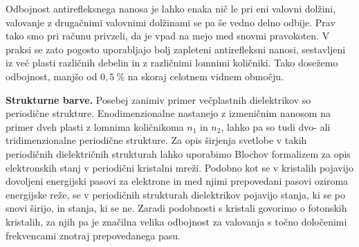 \begin{remark}
Odbojnost antirefleksnega nanosa je lahko enaka nič le pri eni valovni dolžini, valovanje z drugačnimi valovnimi 
dolžinami se pa še vedno delno odbije. Prav tako smo pri računu privzeli, da je vpad na mejo med snovmi 
pravokoten. V praksi se zato pogosto uporabljajo bolj zapleteni antirefleksni nanosi, sestavljeni iz več
plasti različnih debelin in z različnimi lomnimi količniki. Tako dosežemo odbojnost, manjšo od $0,5~\%$
na skoraj celotnem vidnem območju.
\end{remark}

\begin{example}{\bf Strukturne barve.}
Posebej zanimiv primer večplastnih dielektrikov so periodične strukture. Enodimenzionalne 
nastanejo z izmeničnim nanosom na primer dveh plasti z lomnima količnikoma $n_1$ in $n_2$, 
lahko pa so tudi dvo- ali tridimenzionalne periodične strukture. Za opis širjenja svetlobe v
 takih periodičnih dielektričnih strukturah lahko uporabimo Blochov formalizem za opis elektronskih 
 stanj v periodični 
kristalni mreži. Podobno kot se v kristalih pojavijo dovoljeni energijski pasovi za elektrone 
in med njimi prepovedani pasovi oziroma energijske reže, se v periodičnih strukturah dielektrikov
pojavijo stanja, ki se po snovi širijo, in stanja, ki se ne. Zaradi podobnosti s kristali
govorimo o fotonskih kristalih, za njih pa je značilna velika odbojnost za valovanja s točno
določenimi frekvencami znotraj prepovedanega pasu.


\end{example}
